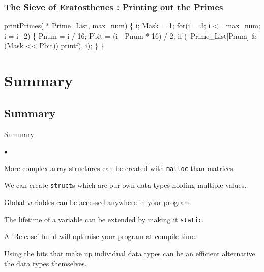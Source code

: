 \documentclass[smaller,handout,table]{beamer}
\begin{document}
\begin{frame}[fragile]
\frametitle{The Sieve of Eratosthenes : Printing out the Primes}
\begin{semiverbatim}
\kr\kl{} printPrimes( * Prime\_List,  max\_num)
\kl\{
\kl   {} i;
\kl   {} Mask = 1;
\kl   for(i = 3; i <= max\_num; i = i+2)
\kl   \{
\kl      {} Pnum = i / 16;
\kl      {} Pbit = (i - Pnum * 16) / 2;
\kl      if (~Prime\_List[Pnum] \& (Mask << Pbit))
\kl         printf(, i);
\kl   \}
\kl\}
\end{semiverbatim}
\end{frame}

\section{Summary}
\subsection{Summary}
\begin{frame}{Summary}
\begin{list}{$\bullet$}{}
\item More complex array structures can be created with \texttt{malloc} than matrices.
\item We can create \texttt{struct}s which are our own data types holding multiple values.
\item Global variables can be accessed anywhere in your program.
\item The lifetime of a variable can be extended by making it \texttt{static}.
\item A 'Release' build will optimise your program at compile-time.
\item Using the bits that make up individual data types can be an efficient alternative the data types themselves.
\end{list}
\end{frame}
\end{document}
